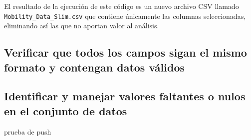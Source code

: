 \noindent El resultado de la ejecución de este código es un nuevo archivo CSV llamado \texttt{Mobility\_Data\_Slim.csv} que contiene únicamente las columnas seleccionadas, eliminando así las que no aportan valor al análisis. 

\subsection{Verificar que todos los campos sigan el mismo formato y contengan datos válidos}

\subsection{Identificar y manejar valores faltantes o nulos en el conjunto de datos}

prueba de push
